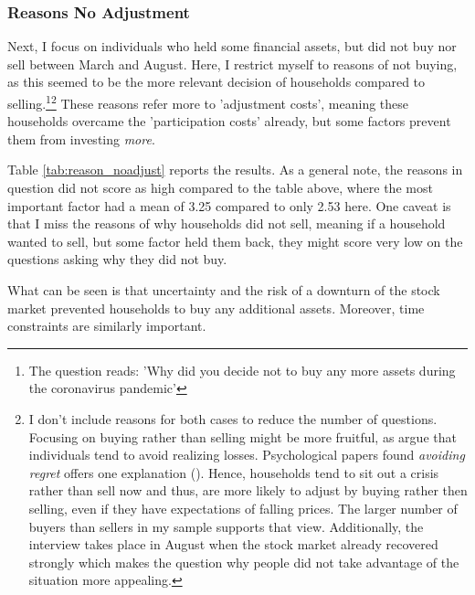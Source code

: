 \documentclass[ProjectABM]{subfiles}
\begin{document}
\subsubsection{Reasons No Adjustment}
Next, I focus on individuals who held some financial assets, but did not buy nor sell between March and August. Here, I restrict myself to reasons of not buying, as this seemed to be the more relevant decision of households compared to selling.\footnote{The question reads: 'Why did you decide not to buy any more assets during the coronavirus pandemic'}\footnote{I don't include reasons for both cases to reduce the number of questions. Focusing on buying rather than selling might be more fruitful, as \cite{Kahneman_Tversky1979_Prospect} argue that individuals tend to avoid realizing losses. Psychological papers found \textit{avoiding regret} offers one explanation (\cite{anderson2003_psychology}). Hence, households tend to sit out a crisis rather than sell now and thus, are more likely to adjust by buying rather then selling, even if they have expectations of falling prices. The larger number of buyers than sellers in my sample supports that view. Additionally, the interview takes place in August when the stock market already recovered strongly which makes the question why people did not take advantage of the situation more appealing.} These reasons refer more to 'adjustment costs', meaning these households overcame the 'participation costs' already, but some factors prevent them from investing \textit{more}.%



Table \ref{tab:reason_noadjust} reports the results. As a general note, the reasons in question did not score as high compared to the table above, where the most important factor had a mean of 3.25 compared to only 2.53 here. %
One caveat is that I miss the reasons of why households did not sell, meaning if a household wanted to sell, but some factor held them back, they might score very low on the questions asking why they did not buy. 

What can be seen is that uncertainty and the risk of a downturn of the stock market prevented households to buy any additional assets. %
Moreover, time constraints are similarly important. %
\end{document}
